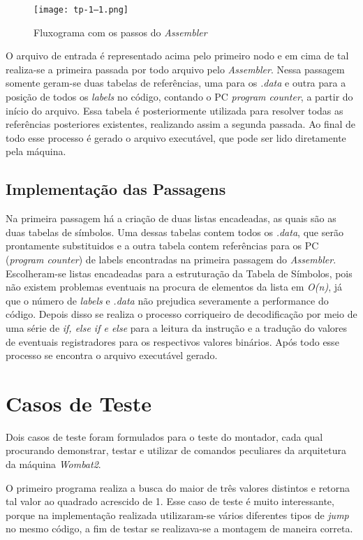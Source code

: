 \documentclass{article}
\begin{document}
\begin{figure}[h!]
\centering
\texttt{[image: tp-1--1.png]}
\caption{Fluxograma com os passos do \textit{Assembler}}
\label{fig:trieExample}
\end{figure}

O arquivo de entrada é representado acima pelo primeiro nodo e em cima de tal realiza-se a primeira passada por todo arquivo pelo \textit{Assembler}. Nessa passagem somente geram-se duas tabelas de referências, uma para os \textit{.data} e outra para a posição de todos os \textit{labels} no código, contando o PC \textit{program counter}, a partir do início do arquivo. Essa tabela é posteriormente utilizada para resolver todas as referências posteriores existentes, realizando assim a segunda passada. Ao final de todo esse processo é gerado o arquivo executável, que pode ser lido diretamente pela máquina.

\subsection{Implementação das Passagens}
Na primeira passagem há a criação de duas listas encadeadas, as quais são as duas tabelas de símbolos. Uma dessas tabelas contem todos os \textit{.data}, que serão prontamente substituidos e a outra tabela contem referências para os PC (\textit{program counter}) de labels encontradas na primeira passagem do \textit{Assembler}. Escolheram-se listas encadeadas para a estruturação da Tabela de Símbolos, pois não existem problemas eventuais na procura de elementos da lista em \textit{O(n)}, já que o número de \textit{labels} e \textit{.data} não prejudica severamente a performance do código.
Depois disso se realiza o processo corriqueiro de decodificação por meio de uma série de \textit{if, else if e else} para a leitura da instrução e a tradução do valores de eventuais registradores para os respectivos valores binários. Após todo esse processo se encontra o arquivo executável gerado.

\section{Casos de Teste}

Dois casos de teste foram formulados para o teste do montador, cada qual procurando demonstrar, testar e utilizar de comandos peculiares da arquitetura da máquina \textit{Wombat2}.

O primeiro programa realiza a busca do maior de três valores distintos e retorna tal valor ao quadrado acrescido de 1. Esse caso de teste é muito interessante, porque na implementação realizada utilizaram-se vários diferentes tipos de \textit{jump} no mesmo código, a fim de testar se realizava-se a montagem de maneira correta.
\end{document}
